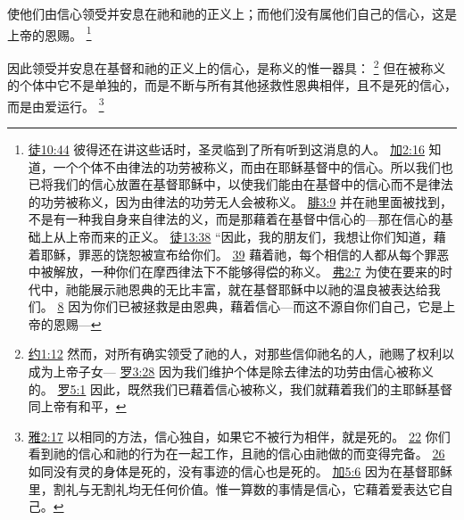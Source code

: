 \documentclass[12pt, a4paper, oneside]{ctexart}
\newcounter{parnum}[section]
\newcommand{\N}{%
   \noindent\refstepcounter{parnum}%
    \makebox[\parindent][l]{\textbf{\arabic{parnum}.}}}
\begin{document}
	使他们由信心领受并安息在祂和祂的正义上；而他们没有属他们自己的信心，这是上帝的恩赐。
	\footnote {
		\href{https://biblehub.com/acts/10-44.htm}{徒10:44} 彼得还在讲这些话时，圣灵临到了所有听到这消息的人。
		\href{https://biblehub.com/galatians/2-16.htm}{加2:16} 知道，一个个体不由律法的功劳被称义，而由在耶稣基督中的信心。所以我们也已将我们的信心放置在基督耶稣中，以使我们能由在基督中的信心而不是律法的功劳被称义，因为由律法的功劳无人会被称义。
		\href{https://biblehub.com/philippians/3-9.htm}{腓3:9} 并在祂里面被找到，不是有一种我自身来自律法的义，而是那藉着在基督中信心的---那在信心的基础上从上帝而来的正义。
		\href{https://biblehub.com/acts/13-38.htm}{徒13:38} “因此，我的朋友们，我想让你们知道，藉着耶稣，罪恶的饶恕被宣布给你们。
		\href{https://biblehub.com/acts/13-39.htm}{39} 藉着祂，每个相信的人都从每个罪恶中被解放，一种你们在摩西律法下不能够得偿的称义。
		\href{https://biblehub.com/ephesians/2-7.htm}{弗2:7} 为使在要来的时代中，祂能展示祂恩典的无比丰富，就在基督耶稣中以祂的温良被表达给我们。
		\href{https://biblehub.com/ephesians/2-8.htm}{8} 因为你们已被拯救是由恩典，藉着信心---而这不源自你们自己，它是上帝的恩赐---
	}

\N 因此领受并安息在基督和祂的正义上的信心，是称义的惟一器具：
	\footnote {
		\href{https://biblehub.com/john/1-12.htm}{约1:12} 然而，对所有确实领受了祂的人，对那些信仰祂名的人，祂赐了权利以成为上帝子女---
		\href{https://biblehub.com/romans/3-28.htm}{罗3:28} 因为我们维护个体是除去律法的功劳由信心被称义的。
        \href{https://biblehub.com/romans/5-1.htm}{罗5:1} 因此，既然我们已藉着信心被称义，我们就藉着我们的主耶稣基督同上帝有和平，
	}
	但在被称义的个体中它不是单独的，而是不断与所有其他拯救性恩典相伴，且不是死的信心，而是由爱运行。
	\footnote {
		\href{https://biblehub.com/james/2-17.htm}{雅2:17} 以相同的方法，信心独自，如果它不被行为相伴，就是死的。
		\href{https://biblehub.com/james/2-22.htm}{22} 你们看到祂的信心和祂的行为在一起工作，且祂的信心由祂做的而变得完备。
		\href{https://biblehub.com/james/2-26.htm}{26} 如同没有灵的身体是死的，没有事迹的信心也是死的。
		\href{https://biblehub.com/galatians/5-6.htm}{加5:6} 因为在基督耶稣里，割礼与无割礼均无任何价值。惟一算数的事情是信心，它藉着爱表达它自己。
	}
\end{document}
